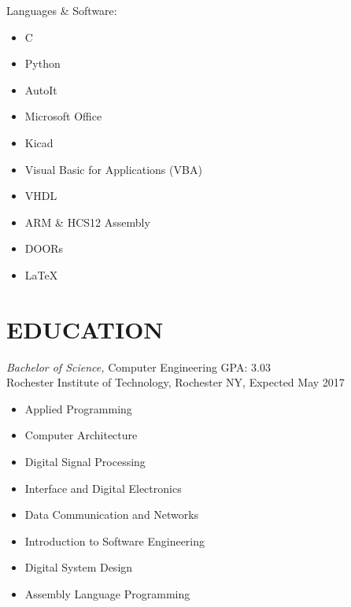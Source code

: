 \documentclass[line,margin]{res}
\begin{document}
\begin{resume}
\begin{multicols}{2}
\begin{itemize}
			\end{itemize}
		\end{multicols}
	\vspace{-10pt}
	{Languages \& Software:} %
		\begin{multicols}{2}
			\begin{itemize}
				\itemsep -2pt
				\item[] C
				\item[] Python
				\item[] AutoIt
				\item[] Microsoft Office
				\item[] Kicad
				\item[] Visual Basic for Applications (VBA)
				\item[] VHDL
				\item[] ARM \& HCS12 Assembly
				\item[] DOORs
				\item[] \LaTeX 
			\end{itemize}
		\end{multicols}
\section{EDUCATION} {\sl Bachelor of Science,} Computer Engineering GPA: 3.03\\
                Rochester Institute of Technology, Rochester NY, 
				Expected May 2017 %
				\begin{multicols}{2}
					\begin{itemize}
						\itemsep -2pt
						\item[] Applied Programming
						\item[] Computer Architecture 
						\item[] Digital Signal Processing
						\item[] Interface and Digital Electronics
						\item[] Data Communication and Networks
						\item[] Introduction to Software Engineering
						\item[] Digital System Design
						\item[] Assembly Language Programming
					\end{itemize}
				\end{multicols}
 

\end{resume}
\end{document}
